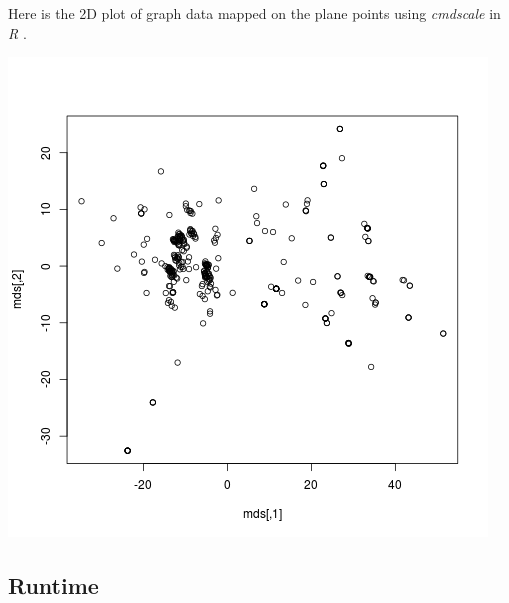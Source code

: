 \documentclass{article}
\begin{document}
        Here is the 2D plot of graph data mapped on the plane points using {\em cmdscale} in {\em R} \cite{cmdscale}.
        
        \includegraphics[scale=0.8]{fb0_2d.png}
        
        \subsection{Runtime}
        
\end{document}
